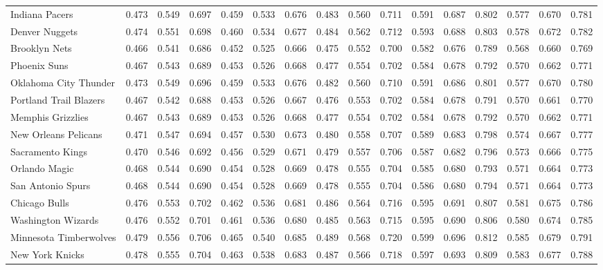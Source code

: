 \documentclass[11pt,a4paper]{article}
\begin{document}
\begin{table}[H]
\begin{tabular}{l ccc ccc ccc ccc ccc}
Indiana Pacers & 0.473 & 0.549 & 0.697 & 0.459 & 0.533 & 0.676 & 0.483 & 0.560 & 0.711 & 0.591 & 0.687 & 0.802 & 0.577 & 0.670 & 0.781 \\
Denver Nuggets & 0.474 & 0.551 & 0.698 & 0.460 & 0.534 & 0.677 & 0.484 & 0.562 & 0.712 & 0.593 & 0.688 & 0.803 & 0.578 & 0.672 & 0.782 \\
Brooklyn Nets & 0.466 & 0.541 & 0.686 & 0.452 & 0.525 & 0.666 & 0.475 & 0.552 & 0.700 & 0.582 & 0.676 & 0.789 & 0.568 & 0.660 & 0.769 \\
Phoenix Suns & 0.467 & 0.543 & 0.689 & 0.453 & 0.526 & 0.668 & 0.477 & 0.554 & 0.702 & 0.584 & 0.678 & 0.792 & 0.570 & 0.662 & 0.771 \\
Oklahoma City Thunder & 0.473 & 0.549 & 0.696 & 0.459 & 0.533 & 0.676 & 0.482 & 0.560 & 0.710 & 0.591 & 0.686 & 0.801 & 0.577 & 0.670 & 0.780 \\
Portland Trail Blazers & 0.467 & 0.542 & 0.688 & 0.453 & 0.526 & 0.667 & 0.476 & 0.553 & 0.702 & 0.584 & 0.678 & 0.791 & 0.570 & 0.661 & 0.770 \\
Memphis Grizzlies & 0.467 & 0.543 & 0.689 & 0.453 & 0.526 & 0.668 & 0.477 & 0.554 & 0.702 & 0.584 & 0.678 & 0.792 & 0.570 & 0.662 & 0.771 \\
New Orleans Pelicans & 0.471 & 0.547 & 0.694 & 0.457 & 0.530 & 0.673 & 0.480 & 0.558 & 0.707 & 0.589 & 0.683 & 0.798 & 0.574 & 0.667 & 0.777 \\
Sacramento Kings & 0.470 & 0.546 & 0.692 & 0.456 & 0.529 & 0.671 & 0.479 & 0.557 & 0.706 & 0.587 & 0.682 & 0.796 & 0.573 & 0.666 & 0.775 \\
Orlando Magic & 0.468 & 0.544 & 0.690 & 0.454 & 0.528 & 0.669 & 0.478 & 0.555 & 0.704 & 0.585 & 0.680 & 0.793 & 0.571 & 0.664 & 0.773 \\
San Antonio Spurs & 0.468 & 0.544 & 0.690 & 0.454 & 0.528 & 0.669 & 0.478 & 0.555 & 0.704 & 0.586 & 0.680 & 0.794 & 0.571 & 0.664 & 0.773 \\
Chicago Bulls & 0.476 & 0.553 & 0.702 & 0.462 & 0.536 & 0.681 & 0.486 & 0.564 & 0.716 & 0.595 & 0.691 & 0.807 & 0.581 & 0.675 & 0.786 \\
Washington Wizards & 0.476 & 0.552 & 0.701 & 0.461 & 0.536 & 0.680 & 0.485 & 0.563 & 0.715 & 0.595 & 0.690 & 0.806 & 0.580 & 0.674 & 0.785 \\
Minnesota Timberwolves & 0.479 & 0.556 & 0.706 & 0.465 & 0.540 & 0.685 & 0.489 & 0.568 & 0.720 & 0.599 & 0.696 & 0.812 & 0.585 & 0.679 & 0.791 \\
New York Knicks & 0.478 & 0.555 & 0.704 & 0.463 & 0.538 & 0.683 & 0.487 & 0.566 & 0.718 & 0.597 & 0.693 & 0.809 & 0.583 & 0.677 & 0.788 \\

\end{tabular}
\end{table}
\end{document}
